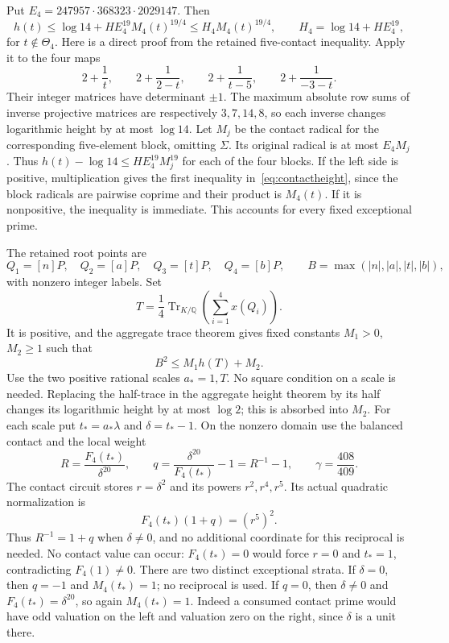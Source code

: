 \documentclass[11pt,a4paper]{article}
\newcommand{\Q}{\mathbb Q}\newcommand{\Z}{\mathbb Z}\newcommand{\HH}{\mathcal H}
\DeclareMathOperator{\Tr}{Tr}\DeclareMathOperator{\Nm}{Nm}
\begin{document}
Put $E_4=247957\cdot368323\cdot2029147$. Then
\begin{equation}\label{eq:contactheight}
 h(t)\le\log14+HE_4^{19}M_4(t)^{19/4}
       \le H_4M_4(t)^{19/4},\qquad
 H_4=\log14+HE_4^{19},
\end{equation}
for $t\notin\Theta_4$. Here is a direct proof from the retained
five-contact inequality. Apply it to the four maps
\[
 2+\frac1t,\qquad 2+\frac1{2-t},\qquad
 2+\frac1{t-5},\qquad2+\frac1{-3-t}.
\]
Their integer matrices have determinant $\pm1$. The maximum absolute
row sums of inverse projective matrices are respectively $3,7,14,8$,
so each inverse changes logarithmic height by at most $\log14$.
Let $M_j$ be the contact radical for the corresponding five-element
block, omitting $\Sigma$. Its original radical is at most $E_4M_j$.
Thus $h(t)-\log14\le HE_4^{19}M_j^{19}$ for each of the four blocks.
If the left side is positive, multiplication gives the first inequality
in~\eqref{eq:contactheight}, since the block radicals are pairwise
coprime and their product is $M_4(t)$. If it is nonpositive, the
inequality is immediate. This accounts for every fixed exceptional prime.

The retained root points are
\[
 Q_1=[n]P,\quad Q_2=[a]P,\quad Q_3=[t]P,\quad Q_4=[b]P,
 \qquad B=\max(|n|,|a|,|t|,|b|),
\]
with nonzero integer labels. Set
\[
 T=\frac14\Tr_{K/\Q}\left(\sum_{i=1}^4x(Q_i)\right).
\]
It is positive, and the aggregate trace theorem gives fixed constants
$M_1>0$, $M_2\ge1$ such that
\begin{equation}\label{eq:aggregate}
                         B^2\le M_1h(T)+M_2.
\end{equation}
Use the two positive rational scales $a_*=1,T$. No square condition
on a scale is needed. Replacing the half-trace in the aggregate
height theorem by its half changes its logarithmic height by at
most $\log2$; this is absorbed into $M_2$.
For each scale put $t_*=a_*\lambda$ and $\delta=t_*-1$.
On the nonzero domain use the balanced contact and the local weight
\begin{equation}\label{eq:detector}
 R=\frac{F_4(t_*)}{\delta^{20}},\qquad
 q=\frac{\delta^{20}}{F_4(t_*)}-1=R^{-1}-1,
 \qquad \gamma=\frac{408}{409}.
\end{equation}
The contact circuit stores $r=\delta^2$ and its powers $r^2,r^4,r^5$.
Its actual quadratic normalization is
\begin{equation}\label{eq:clearing}
                         F_4(t_*)(1+q)=(r^5)^2.
\end{equation}
Thus $R^{-1}=1+q$ when $\delta\ne0$, and no additional coordinate
for this reciprocal is needed. No contact value can occur:
$F_4(t_*)=0$ would force $r=0$ and $t_*=1$, contradicting $F_4(1)\ne0$.
There are two distinct exceptional strata. If $\delta=0$, then $q=-1$
and $M_4(t_*)=1$; no reciprocal is used. If $q=0$, then $\delta\ne0$
and $F_4(t_*)=\delta^{20}$, so again $M_4(t_*)=1$. Indeed a consumed
contact prime would have odd valuation on the left and valuation zero
on the right, since $\delta$ is a unit there.
\end{document}
